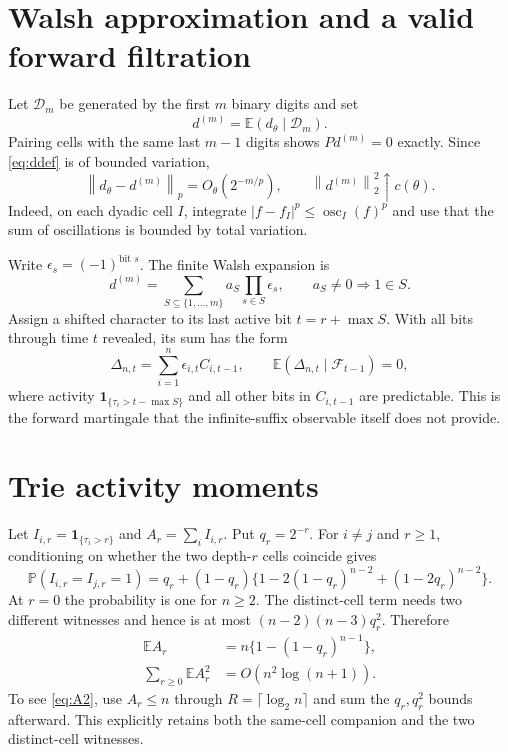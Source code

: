 \documentclass[11pt]{article}
\numberwithin{equation}{section}
\theoremstyle{definition}\newtheorem{definition}[theorem]{Definition}
\theoremstyle{remark}\newtheorem{remark}[theorem]{Remark}
\newcommand{\E}{\mathbb E}\newcommand{\Pp}{\mathbb P}
\newcommand{\1}{\mathbf 1}\newcommand{\cD}{\mathcal D}
\newcommand{\cF}{\mathcal F}\newcommand{\cG}{\mathcal G}
\newcommand{\norm}[1]{\left\lVert#1\right\rVert}
\begin{document}
\clearpage
\section{Walsh approximation and a valid forward filtration}\label{sec:walsh}
Let $\cD_m$ be generated by the first $m$ binary digits and set
\begin{equation}d^{(m)}=\E(d_\theta\mid\cD_m).                  \label{eq:dm}
\end{equation}
Pairing cells with the same last $m-1$ digits shows $Pd^{(m)}=0$ exactly.
Since \eqref{eq:ddef} is of bounded variation,
\begin{equation}
 \norm{d_\theta-d^{(m)}}_p=O_\theta(2^{-m/p}),\qquad
 \norm{d^{(m)}}_2^2\uparrow c(\theta).                         \label{eq:approx}
\end{equation}
Indeed, on each dyadic cell $I$, integrate
$|f-f_I|^p\le\operatorname {osc}_I(f)^p$ and use that the sum of
oscillations is bounded by total variation.

Write $\epsilon_s=(-1)^{\text{bit }s}$.  The finite Walsh expansion is
\begin{equation}d^{(m)}=\sum_{S\subseteq\{1,\ldots,m\}}a_S
 \prod_{s\in S}\epsilon_s,\qquad a_S\ne0\Rightarrow1\in S.    \label{eq:Walsh}
\end{equation}
Assign a shifted character to its last active bit $t=r+\max S$.  With all
bits through time $t$ revealed, its sum has the form
\begin{equation}\Delta_{n,t}=\sum_{i=1}^n\epsilon_{i,t}C_{i,t-1},
 \qquad \E(\Delta_{n,t}\mid\cF_{t-1})=0,                       \label{eq:increment}
\end{equation}
where activity $\1_{\{\tau_i>t-\max S\}}$ and all other bits in
$C_{i,t-1}$ are predictable.  This is the forward martingale that the
infinite-suffix observable itself does not provide.

\clearpage
\section{Trie activity moments}\label{sec:activity}
Let $I_{i,r}=\1_{\{\tau_i>r\}}$ and $A_r=\sum_iI_{i,r}$.  Put $q_r=2^{-r}$.
For $i\ne j$ and $r\ge1$, conditioning on whether the two depth-$r$ cells
coincide gives
\begin{equation}
 \Pp(I_{i,r}=I_{j,r}=1)=q_r+(1-q_r)
 \{1-2(1-q_r)^{n-2}+(1-2q_r)^{n-2}\}.                         \label{eq:pair}
\end{equation}
At $r=0$ the probability is one for $n\ge2$.  The distinct-cell term needs
two different witnesses and hence is at most $(n-2)(n-3)q_r^2$.  Therefore
\begin{align}
 \E A_r&=n\{1-(1-q_r)^{n-1}\},                                \label{eq:EA}\\
 \sum_{r\ge0}\E A_r^2&=O(n^2\log(n+1)).                       \label{eq:A2}
\end{align}
To see \eqref{eq:A2}, use $A_r\le n$ through
$R=\lceil\log_2n\rceil$ and sum the $q_r,q_r^2$ bounds afterward.  This
explicitly retains both the same-cell companion and the two distinct-cell
witnesses.
\end{document}
